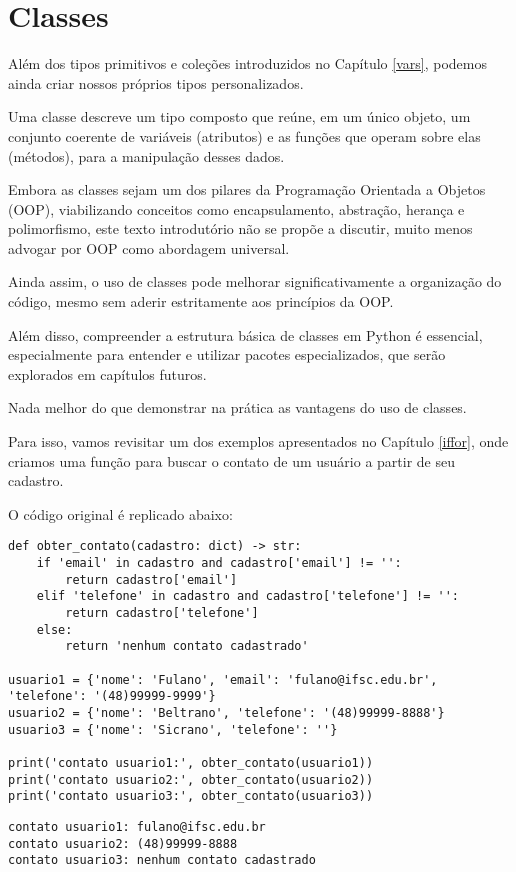 \chapter{Classes}\label{class}

Além dos tipos primitivos e coleções introduzidos no Capítulo \ref{vars}, podemos ainda criar nossos próprios tipos personalizados.

Uma classe descreve um tipo composto que reúne, em um único objeto, um conjunto coerente de variáveis (atributos) e as
funções que operam sobre elas (métodos), para a manipulação desses dados.


Embora as classes sejam um dos pilares da Programação Orientada a Objetos (OOP), viabilizando conceitos como encapsulamento,
abstração, herança e polimorfismo, este texto introdutório não se propõe a discutir, muito menos advogar por OOP como
abordagem universal.

Ainda assim, o uso de classes pode melhorar significativamente a organização do código, mesmo sem aderir estritamente
aos princípios da OOP.

Além disso, compreender a estrutura básica de classes em Python é essencial, especialmente para entender e utilizar
pacotes especializados, que serão explorados em capítulos futuros.

Nada melhor do que demonstrar na prática as vantagens do uso de classes.

Para isso, vamos revisitar um dos exemplos apresentados no Capítulo \ref{iffor}, onde criamos uma função para buscar
o contato de um usuário a partir de seu cadastro.

O código original é replicado abaixo:

\begin{verbatim}
def obter_contato(cadastro: dict) -> str:
    if 'email' in cadastro and cadastro['email'] != '':
        return cadastro['email']
    elif 'telefone' in cadastro and cadastro['telefone'] != '':
        return cadastro['telefone']
    else:
        return 'nenhum contato cadastrado'

usuario1 = {'nome': 'Fulano', 'email': 'fulano@ifsc.edu.br', 'telefone': '(48)99999-9999'}
usuario2 = {'nome': 'Beltrano', 'telefone': '(48)99999-8888'}
usuario3 = {'nome': 'Sicrano', 'telefone': ''}

print('contato usuario1:', obter_contato(usuario1))
print('contato usuario2:', obter_contato(usuario2))
print('contato usuario3:', obter_contato(usuario3))
\end{verbatim}
\begin{verbatim}
contato usuario1: fulano@ifsc.edu.br
contato usuario2: (48)99999-8888
contato usuario3: nenhum contato cadastrado
\end{verbatim}


